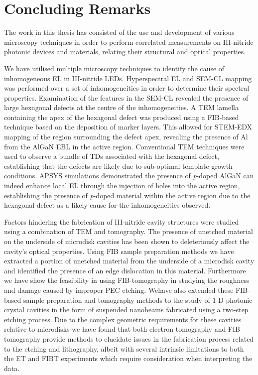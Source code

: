 \chapter{Concluding Remarks}

The work in this thesis has consisted of the use and development of various microscopy techniques in order to perform correlated measurements on III-nitride photonic devices and materials, relating their structural and optical properties.

We have utilised multiple microscopy techniques to identify the cause of inhomogeneous EL in III-nitride LEDs. Hyperspectral EL and SEM-CL mapping was performed over a set of inhomogeneities in order to determine their spectral properties. Examination of the features in the SEM-CL revealed the presence of large hexagonal defects at the centre of the inhomogeneities. A TEM lamella containing the apex of the hexagonal defect was produced using a FIB-based technique based on the deposition of marker layers. This allowed for STEM-EDX mapping of the region surrounding the defect apex, revealing the presence of Al from the AlGaN EBL in the active region. Conventional TEM techniques were used to observe a bundle of TDs associated with the hexagonal defect, establishing that the defects are likely due to sub-optimal template growth conditions. APSYS simulations demonstrated the presence of \textit{p}-doped AlGaN can indeed enhance local EL through the injection of holes into the active region, establishing the presence of \textit{p}-doped material within the active region due to the hexagonal defect as a likely cause for the inhomogeneities observed.

Factors hindering the fabrication of III-nitride cavity structures were studied using a combination of TEM and tomography. The presence of unetched material on the underside of microdisk cavities has been shown to deleteriously affect the cavity's optical properties. Using FIB sample preparation methods we have extracted a portion of unetched material from the underside of a microdisk cavity and identified the presence of an edge dislocation in this material. Furthermore we have show the feasibility in using FIB-tomography in studying the roughness and damage caused by improper PEC etching. Wehave also extended these FIB-based sample preparation and tomography methods to the study of 1-D photonic crystal cavities in the form of suspended nanobeams fabricated using a two-step etching process. Due to the complex geometric requirements for these cavities relative to microdisks we have found that both electron tomography and FIB tomography provide methods to elucidate issues in the fabrication process related to the etching and lithography, albeit with several intrinsic limitations to both the ET and FIBT experiments which require consideration when interpreting the data.

